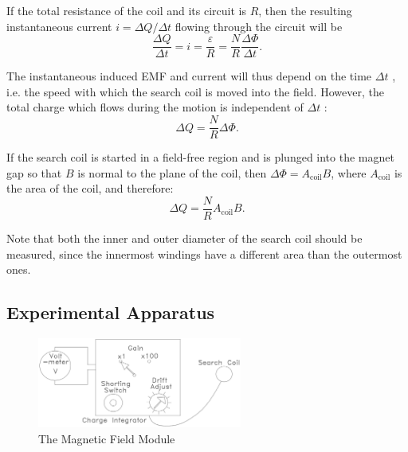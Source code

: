 If the total resistance of the coil and its circuit is $R$, then the resulting instantaneous current $i = \Delta Q / \Delta t$ flowing through the circuit will be
\begin{equation}
  \frac{\Delta Q}{\Delta t}=i=\frac{\varepsilon}{R}=\frac{N}{R}\frac{\Delta\Phi}{\Delta t}.
\end{equation}

The instantaneous induced EMF and current will thus depend on the time $\Delta t$ , i.e. the speed with which the search coil is moved into the field. However, the total charge which flows during the motion is independent of $\Delta t$ :
\begin{equation}
  \Delta Q=\frac{N}{R}\Delta\Phi.
\end{equation}

If the search coil is started in a field-free region and is plunged into the magnet gap so that $B$ is normal to the plane of the coil, then $\Delta \Phi = A_{\mathrm{coil}} B$, where $A_{\mathrm{coil}}$ is the area of the coil, and therefore:
\begin{equation}
  \Delta Q=\frac{N}{R}A_{\mathrm{coil}}B.
\end{equation}

Note that both the inner and outer diameter of the search coil should be measured, since the innermost windings have a different area than the outermost ones.

\subsection{Experimental Apparatus}
\begin{figure}[h]
\centering
\includegraphics[width=0.6\textwidth]{./Exp4/pic/image4.png}
\caption{The Magnetic Field Module}
\label{fig:module}
\end{figure} 

